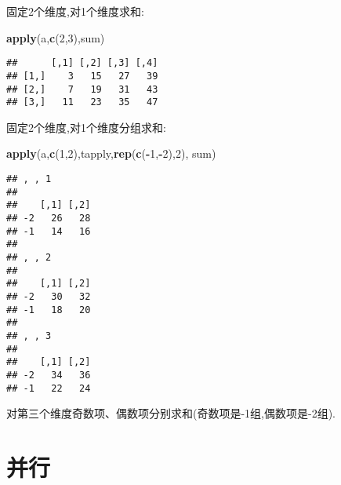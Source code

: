 \documentclass[]{ctexbook}
\newenvironment{Shaded}{\begin{snugshade}}{\end{snugshade}}
\newcommand{\DecValTok}[1]{\textcolor[rgb]{0.00,0.00,0.81}{#1}}
\newcommand{\KeywordTok}[1]{\textcolor[rgb]{0.13,0.29,0.53}{\textbf{#1}}}
\newcommand{\NormalTok}[1]{#1}
\newcommand{\OperatorTok}[1]{\textcolor[rgb]{0.81,0.36,0.00}{\textbf{#1}}}
\begin{document}
固定2个维度,对1个维度求和:

\begin{Shaded}
\begin{Highlighting}[]
\KeywordTok{apply}\NormalTok{(a,}\KeywordTok{c}\NormalTok{(}\DecValTok{2}\NormalTok{,}\DecValTok{3}\NormalTok{),sum)}
\end{Highlighting}
\end{Shaded}

\begin{verbatim}
##      [,1] [,2] [,3] [,4]
## [1,]    3   15   27   39
## [2,]    7   19   31   43
## [3,]   11   23   35   47
\end{verbatim}

固定2个维度,对1个维度分组求和:

\begin{Shaded}
\begin{Highlighting}[]
\KeywordTok{apply}\NormalTok{(a,}\KeywordTok{c}\NormalTok{(}\DecValTok{1}\NormalTok{,}\DecValTok{2}\NormalTok{),tapply,}\KeywordTok{rep}\NormalTok{(}\KeywordTok{c}\NormalTok{(}\OperatorTok{-}\DecValTok{1}\NormalTok{,}\OperatorTok{-}\DecValTok{2}\NormalTok{),}\DecValTok{2}\NormalTok{), sum)}
\end{Highlighting}
\end{Shaded}

\begin{verbatim}
## , , 1
## 
##    [,1] [,2]
## -2   26   28
## -1   14   16
## 
## , , 2
## 
##    [,1] [,2]
## -2   30   32
## -1   18   20
## 
## , , 3
## 
##    [,1] [,2]
## -2   34   36
## -1   22   24
\end{verbatim}

对第三个维度奇数项、偶数项分别求和(奇数项是-1组,偶数项是-2组).

\hypertarget{section-12}{%
\section{并行}\label{section-12}}
\end{document}
